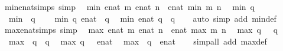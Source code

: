 \begin{isabellebody}
\isamarkupfalse%
\ min{\isacharunderscore}enat{\isacharunderscore}simps\ {\isacharbrackleft}simp{\isacharbrackright}{\isacharcolon}\isanewline
\ \ {\isachardoublequoteopen}min\ {\isacharparenleft}enat\ m{\isacharparenright}\ {\isacharparenleft}enat\ n{\isacharparenright}\ {\isacharequal}\ enat\ {\isacharparenleft}min\ m\ n{\isacharparenright}{\isachardoublequoteclose}\isanewline
\ \ {\isachardoublequoteopen}min\ q\ {}\ {\isacharequal}\ {}{\isachardoublequoteclose}\isanewline
\ \ {\isachardoublequoteopen}min\ {}\ q\ {\isacharequal}\ {}{\isachardoublequoteclose}\isanewline
\ \ {\isachardoublequoteopen}min\ q\ {\isacharparenleft}{\isasyminfinity}{\isacharcolon}{\isacharcolon}enat{\isacharparenright}\ {\isacharequal}\ q{\isachardoublequoteclose}\isanewline
\ \ {\isachardoublequoteopen}min\ {\isacharparenleft}{\isasyminfinity}{\isacharcolon}{\isacharcolon}enat{\isacharparenright}\ q\ {\isacharequal}\ q{\isachardoublequoteclose}\isanewline
%
\isadelimproof
\ \ %
\endisadelimproof
%
\isatagproof
{}\isamarkupfalse%
\ {\isacharparenleft}auto\ simp\ add{\isacharcolon}\ min{\isacharunderscore}def{\isacharparenright}%
\endisatagproof
{\isafoldproof}%
%
\isadelimproof
\isanewline
%
\endisadelimproof
\isanewline
{}\isamarkupfalse%
\ max{\isacharunderscore}enat{\isacharunderscore}simps\ {\isacharbrackleft}simp{\isacharbrackright}{\isacharcolon}\isanewline
\ \ {\isachardoublequoteopen}max\ {\isacharparenleft}enat\ m{\isacharparenright}\ {\isacharparenleft}enat\ n{\isacharparenright}\ {\isacharequal}\ enat\ {\isacharparenleft}max\ m\ n{\isacharparenright}{\isachardoublequoteclose}\isanewline
\ \ {\isachardoublequoteopen}max\ q\ {}\ {\isacharequal}\ q{\isachardoublequoteclose}\isanewline
\ \ {\isachardoublequoteopen}max\ {}\ q\ {\isacharequal}\ q{\isachardoublequoteclose}\isanewline
\ \ {\isachardoublequoteopen}max\ q\ {\isasyminfinity}\ {\isacharequal}\ {\isacharparenleft}{\isasyminfinity}{\isacharcolon}{\isacharcolon}enat{\isacharparenright}{\isachardoublequoteclose}\isanewline
\ \ {\isachardoublequoteopen}max\ {\isasyminfinity}\ q\ {\isacharequal}\ {\isacharparenleft}{\isasyminfinity}{\isacharcolon}{\isacharcolon}enat{\isacharparenright}{\isachardoublequoteclose}\isanewline
%
\isadelimproof
\ \ %
\endisadelimproof
%
\isatagproof
{}\isamarkupfalse%
\ {\isacharparenleft}simp{\isacharunderscore}all\ add{\isacharcolon}\ max{\isacharunderscore}def{\isacharparenright}%
\endisatagproof
{\isafoldproof}%
%
\isadelimproof
\isanewline
%
\endisadelimproof

\end{isabellebody}
